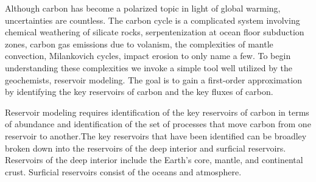 Although carbon has become a polarized topic in light of global warming, uncertainties are countless. The carbon cycle is a complicated system involving chemical weathering of silicate rocks, serpentenization at ocean floor subduction zones, carbon gas emissions due to volanism, the complexities of mantle convection, Milankovich cycles, impact erosion to only name a few. To begin understanding these complexities we invoke a simple tool well utilized by the geochemists, reservoir modeling. The goal is to gain a first-order approximation by identifying the key reservoirs of carbon and the key fluxes of carbon. 


Reservoir modeling requires identification of the key reservoirs of carbon in terms of abundance and identification of the set of processes that move carbon from one reservoir to another.The key reservoirs that have been identified can be broadley broken down into the reservoirs of the deep interior and surficial reservoirs. Reservoirs of the deep interior include the Earth's core, mantle, and continental crust. Surficial reservoirs consist of the oceans and atmosphere.
